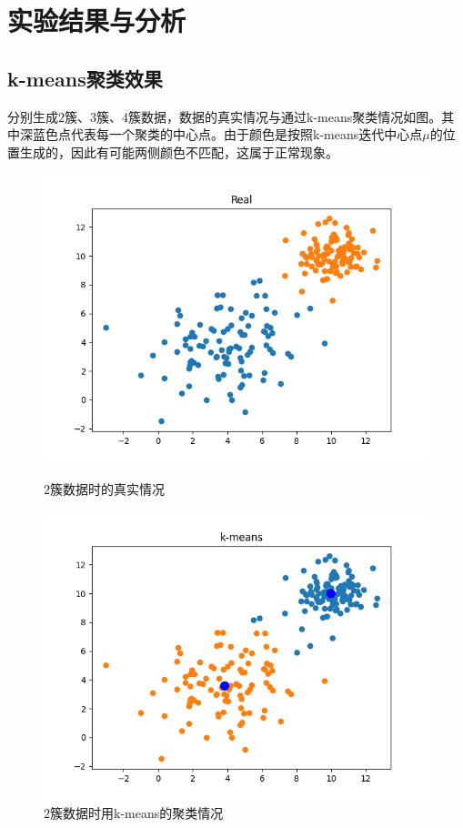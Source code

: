 \section{实验结果与分析}

\subsection{k-means聚类效果}

分别生成$2$簇、$3$簇、$4$簇数据，数据的真实情况与通过k-means聚类情况如图。其中深蓝色点代表每一个聚类的中心点。由于颜色是按照k-means迭代中心点$\mu$的位置生成的，因此有可能两侧颜色不匹配，这属于正常现象。
\begin{figure}[htbp]
    \begin{minipage}[t]{0.5\linewidth}
        \centering
        \includegraphics[width=\textwidth]{figures/Figure_1.png}
        \caption{$2$簇数据时的真实情况}
    \end{minipage}
    \begin{minipage}[t]{0.5\linewidth}
        \centering
        \includegraphics[width=\textwidth]{figures/Figure_2.png}
        \caption{$2$簇数据时用k-means的聚类情况}
    \end{minipage}
\end{figure}
